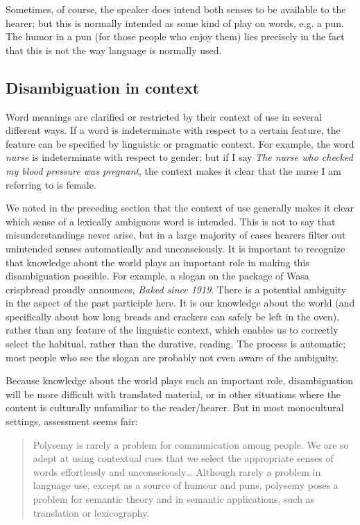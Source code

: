 Sometimes, of course, the speaker does intend both senses to be available to the hearer; but this is normally intended as some kind of play on words, e.g. a pun. The humor in a pun (for those people who enjoy them) lies precisely in the fact that this is not the way language is normally used.


\subsection{Disambiguation in context}\label{sec:5.3.5}

Word meanings are clarified or restricted by their context of use in several different ways. If a word is indeterminate with respect to a certain feature, the feature can be specified by linguistic or pragmatic context. For example, the word \textit{nurse} is indeterminate with respect to gender; but if I say \textit{The nurse who checked my blood pressure was pregnant}, the context makes it clear that the nurse I am referring to is female.



We noted in the preceding section that the context of use generally makes it clear which sense of a lexically ambiguous word is intended. This is not to say that misunderstandings never arise, but in a large majority of cases hearers filter out unintended senses automatically and unconsciously. It is important to recognize that knowledge about the world plays an important role in making this disambiguation possible. For example, a slogan on the package of Wasa crispbread proudly announces, \textit{Baked since 1919}. There is a potential ambiguity in the aspect of the past participle here. It is our knowledge about the world (and specifically about how long breads and crackers can safely be left in the oven), rather than any feature of the linguistic context, which enables us to correctly select the habitual, rather than the durative, reading. The process is automatic; most people who see the slogan are probably not even aware of the ambiguity.



Because knowledge about the world plays such an important role, disambiguation will be more difficult with translated material, or in other situations where the content is culturally unfamiliar to the reader/hearer. But in most monocultural settings,  assessment seems fair:


\begin{quote}
Polysemy is rarely a problem for communication among people. We are so adept at using contextual cues that we select the appropriate senses of words effortlessly and unconsciously… Although rarely a problem in language use, except as a source of humour and puns, polysemy poses a problem for semantic theory and in semantic applications, such as translation or lexicography.
\end{quote}


